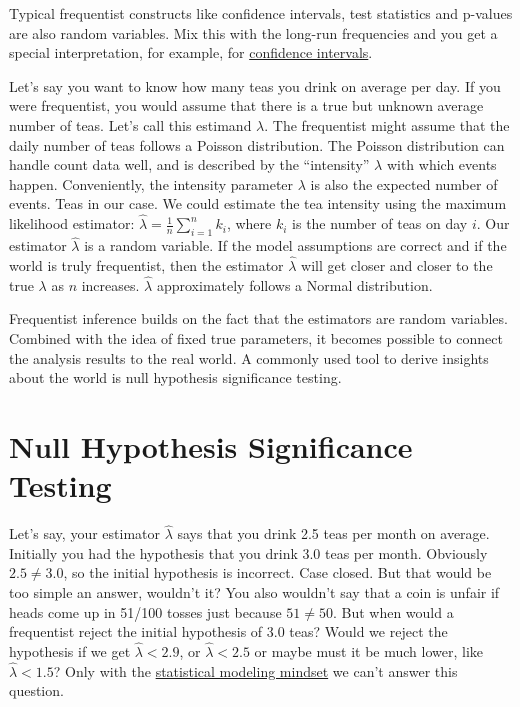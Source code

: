 \documentclass[
  10pt,
]{scrbook}
\begin{document}
Typical frequentist constructs like confidence intervals, test statistics and p-values are also random variables.
Mix this with the long-run frequencies and you get a special interpretation, for example, for \protect\hyperlink{confidence-intervals}{confidence intervals}.

Let's say you want to know how many teas you drink on average per day.
If you were frequentist, you would assume that there is a true but unknown average number of teas.
Let's call this estimand \(\lambda\).
The frequentist might assume that the daily number of teas follows a Poisson distribution.
The Poisson distribution can handle count data well, and is described by the ``intensity'' \(\lambda\) with which events happen.
Conveniently, the intensity parameter \(\lambda\) is also the expected number of events.
Teas in our case.
We could estimate the tea intensity using the maximum likelihood estimator: \(\hat{\lambda}= \frac{1}{n} \sum_{i=1}^n k_i\), where \(k_i\) is the number of teas on day \(i\).
Our estimator \(\hat{\lambda}\) is a random variable.
If the model assumptions are correct and if the world is truly frequentist, then the estimator \(\hat{\lambda}\) will get closer and closer to the true \(\lambda\) as \(n\) increases.
\(\hat{\lambda}\) approximately follows a Normal distribution.

Frequentist inference builds on the fact that the estimators are random variables.
Combined with the idea of fixed true parameters, it becomes possible to connect the analysis results to the real world.
A commonly used tool to derive insights about the world is null hypothesis significance testing.

\hypertarget{null-hypothesis-significance-testing}{%
\section{Null Hypothesis Significance Testing}\label{null-hypothesis-significance-testing}}

Let's say, your estimator \(\hat{\lambda}\) says that you drink 2.5 teas per month on average.
Initially you had the hypothesis that you drink 3.0 teas per month.
Obviously \(2.5 \neq 3.0\), so the initial hypothesis is incorrect.
Case closed.
But that would be too simple an answer, wouldn't it?
You also wouldn't say that a coin is unfair if heads come up in 51/100 tosses just because \(51 \neq 50\).
But when would a frequentist reject the initial hypothesis of 3.0 teas?
Would we reject the hypothesis if we get \(\hat{\lambda}<2.9\), or \(\hat{\lambda}<2.5\) or maybe must it be much lower, like \(\hat{\lambda}<1.5\)?
Only with the \protect\hyperlink{statistical-modeling}{statistical modeling mindset} we can't answer this question.
\end{document}
